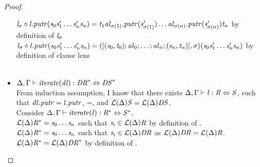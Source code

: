 \begin{lemma}
\begin{proof}
\begin{itemize}
$\mathit{l}_{\sigma} \circ \mathit{l}.\mathit{putr}(\mathit{s}_0\mathit{s}_1'\ldots\mathit{s}_n'\mathit{s}_n)=\mathit{t}_1\mathit{al}_{\sigma(1)}.\mathit{putr}(\mathit{s}_{\sigma(1)}')\ldots\mathit{al}_{\sigma(n)}.\mathit{putr}(\mathit{s}_{\sigma(n)}')\mathit{t}_n$ by definition of $\mathit{l}_{\sigma}$\\
$\mathit{l}_{\sigma} \circ \mathit{l}.\mathit{putr}(\mathit{s}_0\mathit{s}_1'\ldots\mathit{s}_n'\mathit{s}_n)=([(\mathit{s}_0,\mathit{t}_0);\mathit{al}_0;\ldots;\mathit{al}_n;(\mathit{s}_n,\mathit{t}_n)],\sigma)(\mathit{s}_0\mathit{s}_1'\ldots\mathit{s}_n'\mathit{s}_n)$ by definition of clause lens\\
\\
\item$\Delta, \Gamma \vdash \mathit{iterate(\mathit{dl})} : \mathit{DR}^* \Leftrightarrow \mathit{DS}^*$\\
From induction assumption, I know that there exists $\Delta, \Gamma \vdash \mathit{l} : \mathit{R} \Leftrightarrow \mathit{S}$, such that
$\mathit{dl}.\mathit{putr}=\mathit{l}.\mathit{putr}$,
\LanguageOf{\RegexContext}{\Regex}=\LanguageOf{\RegexContext}{\DNFRegex}, and
$\mathcal{L}(\Delta){\mathit{S}}=\mathcal{L}(\Delta){\mathit{DS}}$.\\
Consider $\Delta, \Gamma \vdash \mathit{iterate(\mathit{l})} : \mathit{R}^* \Leftrightarrow \mathit{S}^*$.\\
$\mathcal{L}(\Delta){\mathit{R}^*} = \mathit{s}_0\ldots\mathit{s}_n$ such that $\mathit{s}_i \in \mathcal{L}(\Delta){\mathit{R}}$ by definition of \LanguageOf{\Delta}{\Star{\Regex}}.\\
$\mathcal{L}(\Delta){\mathit{R}^*} = \mathit{s}_0\ldots\mathit{s}_n$ such that $\mathit{s}_i \in \mathcal{L}(\Delta){\mathit{DR}}$ as $\mathcal{L}(\Delta){\mathit{DR}}=\mathcal{L}(\Delta){\mathit{R}}$.\\
$\mathcal{L}(\Delta){\mathit{R}^*} = \mathcal{L}(\Delta){\mathit{DR}^*}$ by definition of \LanguageOf{\RegexContext}{\Star{\DNFRegex}}.


\end{itemize}
\end{proof}
\end{lemma}
